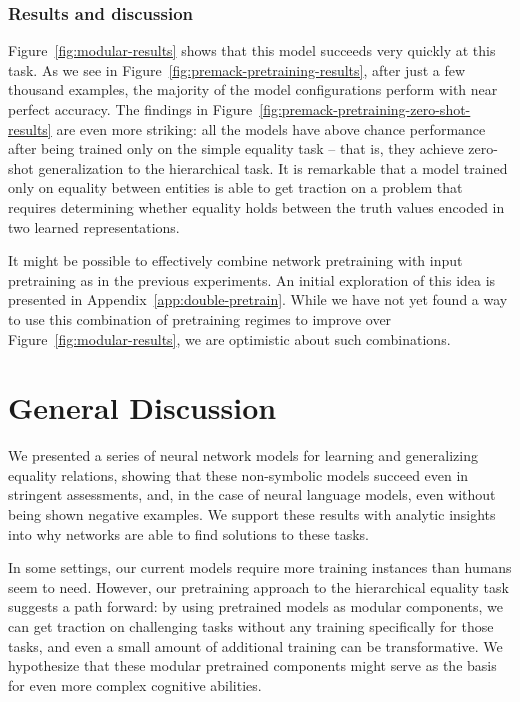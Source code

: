 \documentclass[9pt,twocolumn,twoside,lineno]{pnas-new}
\newcommand{\Figref}[1]{Figure~\ref{#1}}
\newcommand{\figref}[1]{Figure~\ref{#1}}
\newcommand{\appref}[1]{Appendix~\ref{#1}}
\newcommand{\update}[1]{{\color{darkblue}#1}}
\begin{document}
\subsubsection*{Results and discussion}

\update{\Figref{fig:modular-results} shows that this model succeeds very quickly at this task. As we see in \figref{fig:premack-pretraining-results}, after just a few thousand examples, the majority of the model configurations perform with near perfect accuracy. The findings in \figref{fig:premack-pretraining-zero-shot-results} are even more striking: all the models have above chance performance after being trained only on the simple equality task -- that is, they achieve zero-shot generalization to the hierarchical task.} It is remarkable that a model trained only on equality between entities is able to get traction on a problem that requires determining whether equality holds between the truth values encoded in two learned representations.

\update{
It might be possible to effectively combine network pretraining with input pretraining as in the previous experiments. An initial exploration of this idea is presented in \appref{app:double-pretrain}. While we have not yet found a way to use this combination of pretraining regimes to improve over \figref{fig:modular-results}, we are optimistic about such combinations.}


\section*{General Discussion}

We presented a series of neural network models for learning and generalizing equality relations, showing that these non-symbolic models succeed even in stringent assessments, and, in the case of neural language models, even without being shown negative examples. We support these results with analytic insights into why networks are able to find solutions to these tasks.

In some settings, our current models require more training instances than humans seem to need. However, our pretraining approach to the hierarchical equality task suggests a path forward: by using pretrained models as modular components, we can get traction on challenging tasks without any training specifically for those tasks, and even a small amount of additional training can be transformative.  We hypothesize that these modular pretrained components might serve as the basis for even more complex cognitive abilities.
\end{document}
